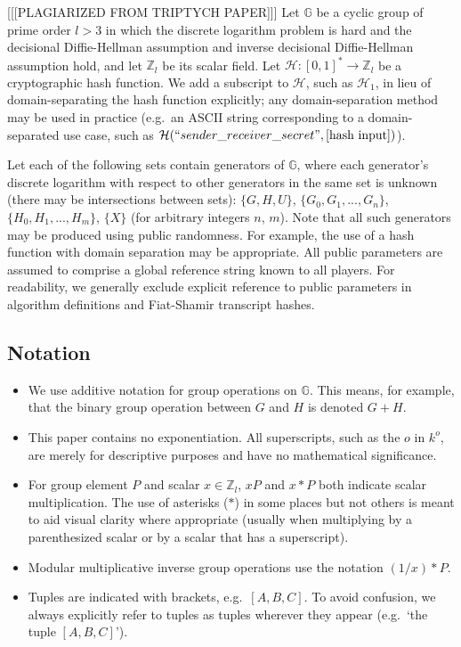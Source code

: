 [[[PLAGIARIZED FROM TRIPTYCH PAPER]]] Let $\mathbb{G}$ be a cyclic group of prime order $l > 3$ in which the discrete logarithm problem is hard and the decisional Diffie-Hellman assumption and inverse decisional Diffie-Hellman assumption hold, and let $\mathbb{Z}_l$ be its scalar field. Let $\mathcal{H}: [0,1]^* \to \mathbb{Z}_l$ be a cryptographic hash function. We add a subscript to $\mathcal{H}$, such as $\mathcal{H}_1$, in lieu of domain-separating the hash function explicitly; any domain-separation method may be used in practice (e.g.\ an ASCII string corresponding to a domain-separated use case, such as $\mathcal{H}(``sender\_receiver\_secret",[\textrm{hash input}])$).

Let each of the following sets contain generators of $\mathbb{G}$, where each generator's discrete logarithm with respect to other generators in the same set is unknown (there may be intersections between sets): $\{G, H, U\}$, $\{G_0, G_1,...,G_n\}$, $\{H_0, H_1,...,H_m\}$, $\{X\}$ (for arbitrary integers $n$, $m$). Note that all such generators may be produced using public randomness. For example, the use of a hash function with domain separation may be appropriate. All public parameters are assumed to comprise a global reference string known to all players. For readability, we generally exclude explicit reference to public parameters in algorithm definitions and Fiat-Shamir transcript hashes.


\subsection{Notation}
\label{subsec:preliminaries-notation}

\begin{itemize}
    \item We use additive notation for group operations on $\mathbb{G}$. This means, for example, that the binary group operation between $G$ and $H$ is denoted $G + H$.

    \item This paper contains no exponentiation. All superscripts, such as the $o$ in $k^o$, are merely for descriptive purposes and have no mathematical significance.

    \item For group element $P$ and scalar $x \in \mathbb{Z}_l$, $x P$ and $x*P$ both indicate scalar multiplication. The use of asterisks ($*$) in some places but not others is meant to aid visual clarity where appropriate (usually when multiplying by a parenthesized scalar or by a scalar that has a superscript).

    \item Modular multiplicative inverse group operations use the notation $(1/x)*P$.

    \item Tuples are indicated with brackets, e.g.\ $[A, B, C]$. To avoid confusion, we always explicitly refer to tuples as tuples wherever they appear (e.g.\ `the tuple $[A, B, C]$').
\end{itemize}



